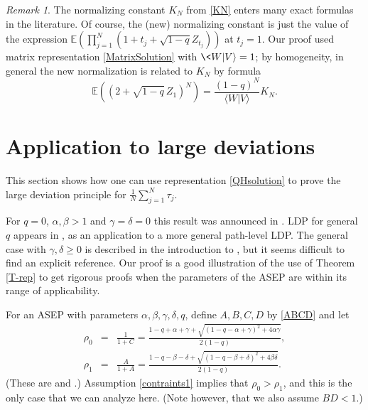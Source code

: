 \documentclass{amsart}
\theoremstyle{definition}
\theoremstyle{remark}
\newtheorem{remark}[theorem]{Remark}
\theoremstyle{remark}
\theoremstyle{definition}
\numberwithin{equation}{section}
\begin{document}
\begin{remark}
  \label{Rem:K} The normalizing constant $K_N$ from  \eqref{KN} enters many exact formulas in the literature.  Of course, the (new) normalizing constant
 is just the value of the expression ${\mathds{E}}\left(\prod_{j=1}^N \left(1+t_j+\sqrt{1-q}Z_{t_j}\right)\right)$
at $t_j=1$. Our proof used matrix representation \eqref{MatrixSolution} with $\<W|V{\rangle}=1$; by homogeneity, in general  the new normalization is related
to $K_N$ by formula
    \begin{equation}\label{recalc-K2U}
  {\mathds{E}}\left((2+\sqrt{1-q}\,Z_1)^N\right)= \frac{(1-q)^N}{\langle W|V\rangle} K_N.
  \end{equation}

\end{remark}

\section{Application to large deviations}\label{Sect:LD}
{}
This section shows how one can use   representation \eqref{QHsolution} to prove the large deviation principle  for $\tfrac1N\sum_{j=1}^N\tau_j$.

For $q=0$, $\alpha,\beta>1$ and $\gamma=\delta=0$ this result was announced in \cite[(30)]{derrida2001free}. LDP for general
$q$ appears in \cite[Section 3.5]{derrida2003exact}, as an application to a more general path-level LDP. The  general case with
$\gamma,\delta\geq 0$ is described in the introduction to \cite{enaud2004large}, but it seems difficult to find an explicit
reference. Our proof is a good illustration of the use of 
Theorem \ref{T-rep} to get rigorous proofs
when the parameters of the ASEP are within its range of applicability.

For an ASEP with parameters $\alpha,\beta,\gamma,\delta,q$, define $A,B,C,D$ by \eqref{ABCD} and let
\begin{eqnarray}
  \label{rho}
  \rho_0&=&\frac{1}{1+C}=  \frac{1-q+\alpha+\gamma+\sqrt{(1-q-\alpha+\gamma)^2+4\alpha\gamma}}{2(1-q)} ,\label{rho-a}\\
   \rho_1&=&\frac{A}{1+A}=    \frac{1-q-\beta-\delta+
   \sqrt{(1-q-\beta+\delta)^2+4\beta\delta}}{2(1-q)}. \label{rho-b}
\end{eqnarray}
(These are \cite[(1.1a) and (1.1b)]{enaud2004large} and \cite[formula (100)]{sandow1994partially}.) Assumption
\eqref{contraints1} implies that $\rho_0>\rho_1$, and this is the only case that we can analyze here. (Note however, that we
also assume $BD<1$.)
\end{document}
